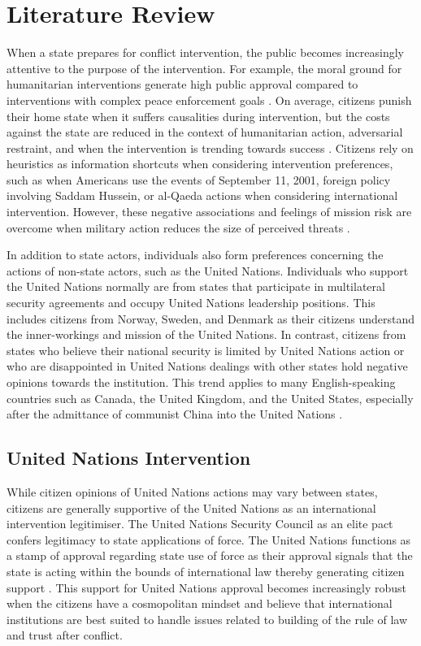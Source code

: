 \documentclass[12pt]{article}
\newcommand{\UN}[1]{United Nations}
\begin{document}
\section*{Literature Review}

When a state prepares for conflict intervention, the public becomes increasingly attentive to the purpose of the intervention. For example, the moral ground for humanitarian interventions generate high public approval compared to interventions with complex peace enforcement goals \citep{burk1999public}. On average, citizens punish their home state when it suffers causalities during intervention, but the costs against the state are reduced in the context of humanitarian action, adversarial restraint, and when the intervention is trending towards success \citep{eichenberg2005victory}. Citizens rely on heuristics as information shortcuts when considering intervention preferences, such as when Americans use the events of September 11, 2001, foreign policy involving Saddam Hussein, or al-Qaeda actions when considering international intervention. However, these negative associations and feelings of mission risk are overcome when military action reduces the size of perceived threats \citep{brownlee2020cognitive,haesebrouck2019follows}. 

In addition to state actors, individuals also form preferences concerning the actions of non-state actors, such as the \UN{}. Individuals who support the \UN{} normally are from states that participate in multilateral security agreements and occupy \UN{} leadership positions. This includes citizens from Norway, Sweden, and Denmark as their citizens understand the inner-workings and mission of the \UN{}. In contrast, citizens from states who believe their national security is limited by \UN{} action or who are disappointed in \UN{} dealings with other states hold negative opinions towards the institution. This trend applies to many English-speaking countries such as Canada, the United Kingdom, and the United States, especially after the admittance of communist China into the \UN{} \citep{millard1993international}. 

\subsection*{United Nations Intervention}

While citizen opinions of \UN{} actions may vary between states, citizens are generally supportive of the \UN{} as an international intervention legitimiser. The \UN{} Security Council as an elite pact confers legitimacy to state applications of force. The \UN{} functions as a stamp of approval regarding state use of force as their approval signals that the state is acting within the bounds of international law thereby generating citizen support \citep{voeten2005political,appel2018intergovernmental}. This support for \UN{} approval becomes increasingly robust when the citizens have a cosmopolitan mindset \citep{ecker2016citizens} and believe that international institutions are best suited to handle issues related to building of the rule of law \citep{blair2019establishing} and trust \citep{glendon2004rule} after conflict. 
\end{document}
